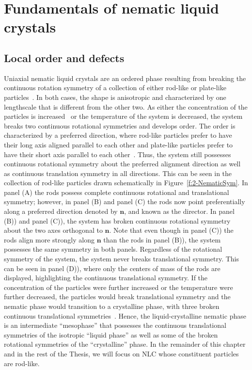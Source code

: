 \chapter{Fundamentals of nematic liquid crystals}

\section{Local order and defects}
Uniaxial nematic liquid crystals are an ordered phase resulting from breaking the continuous rotation symmetry of a collection of either rod-like or plate-like particles~\cite{RN33}.
In both cases, the shape is anisotropic and characterized by one lengthscale that is different from the other two.
As either the concentration of the particles is increased~\cite{RN204} or the temperature of the system is decreased\cite{RN202}, the system breaks two continuous rotational symmetries and develops order.
The order is characterized by a preferred direction, where rod-like particles prefer to have their long axis aligned parallel to each other and plate-like particles prefer to have their short axis parallel to each other~\cite{RN33,RN175}.
Thus, the system still possesses continuous rotational symmetry about the preferred alignment direction as well as continuous translation symmetry in  all directions.
This can be seen in the collection of rod-like particles drawn schematically in Figure~\ref{f:2-NematicSym}.
In panel (A) the rods possess complete continuous rotational and translational symmetry; however, in panel (B) and panel (C) the rods now point preferentially along a preferred direction denoted by $\mathbf{n}$, and known as the director.
In panel (B)) and panel (C)), the system has broken continuous rotational symmetry about the two axes orthogonal to $\mathbf{n}$.
Note that even though in panel (C)) the rods align more strongly along $\mathbf{n}$ than the rods in panel (B)), the system possesses the same symmetry in both panels.
Regardless of the rotational symmetry of the system, the system never breaks translational symmetry.
This can be seen in panel (D)), where only the centers of mass of the rods are displayed, highlighting the continuous translational symmetry.
If the concentration of the particles were further increased or the temperature were further decreased, the particles would break translational symmetry and the nematic phase would transition to a crystalline phase, with three broken continuous translational symmetries~\cite{RN33}.
Hence, the liquid-crystalline nematic phase is an intermediate ``mesophase'' that possesses the continuous translational symmetries of the isotropic ``liquid phase'' as well as some of the broken rotational symmetries of the ``crystalline'' phase.
In the remainder of this chapter and in the rest of the Thesis, we will focus on NLC whose constituent particles are rod-like.

